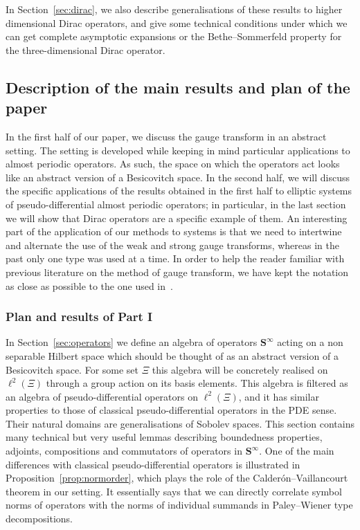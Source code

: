\documentclass[10pt]{amsart}
\theoremstyle{definition}\newtheorem{defi}[theo]{Definition}\newtheorem{rema}[theo]{Remark}\newtheorem{exam}[theo]{Example}\newtheorem{nota}[theo]{Notation}
\newcommand{\BS}{\mathbf S}
\begin{document}
In Section~\ref{sec:dirac}, we also describe generalisations of these results to higher dimensional Dirac operators, and give some technical conditions under which we can get complete asymptotic expansions or the Bethe--Sommerfeld property for the three-dimensional Dirac operator.

\subsection{Description of the main results and plan of the paper}

In the first half of our paper, we discuss the gauge transform in an abstract setting. The setting is developed while keeping in mind particular applications to almost periodic operators. As such, the space on which the operators act looks like an abstract version of a Besicovitch space. In the second half, we will discuss the specific applications of the results obtained in the first half to elliptic systems of pseudo-differential almost periodic operators; in particular, in the last section we will show that Dirac operators are a specific example of them. An interesting part of the application of our methods to systems is that we need to intertwine and alternate the use of the weak and strong gauge transforms, whereas in the past only one type was used at a time. In order to help the reader familiar with previous literature on the method of gauge transform, we have kept the notation as close as possible to the one used in~\cite{MorParSht2014,ParSob2010}.

\subsubsection*{Plan and results of Part I}
In Section~\ref{sec:operators} we define an algebra of operators $\BS^\infty$ acting on a non separable Hilbert space which should be thought of as an abstract version of a Besicovitch space. For some set $\Xi$ this algebra will be concretely realised on $\ell^2(\Xi)$ through a group action on its basis elements. This algebra is filtered as an algebra of pseudo-differential operators on $\ell^2(\Xi)$, and it has similar properties to those of classical pseudo-differential operators in the PDE sense. Their natural domains are generalisations of Sobolev spaces. This section contains many technical but very useful lemmas describing boundedness properties, adjoints, compositions and commutators of operators in $\BS^\infty$. One of the main differences with classical pseudo-differential operators is illustrated in Proposition~\ref{prop:normorder}, which plays the role of the Calder\'on--Vaillancourt theorem in our setting. It essentially says that we can directly correlate symbol norms of operators with the norms of individual summands in Paley--Wiener type decompositions.
\end{document}
